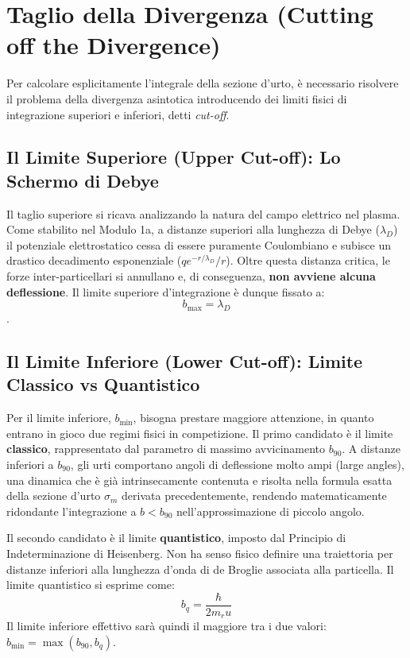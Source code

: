 \section{Taglio della Divergenza (Cutting off the Divergence)}

Per calcolare esplicitamente l'integrale della sezione d'urto, è necessario risolvere il problema della divergenza asintotica introducendo dei limiti fisici di integrazione superiori e inferiori, detti \textit{cut-off}.

\subsection{Il Limite Superiore (Upper Cut-off): Lo Schermo di Debye}
Il taglio superiore si ricava analizzando la natura del campo elettrico nel plasma. Come stabilito nel Modulo 1a, a distanze superiori alla lunghezza di Debye ($\lambda_D$) il potenziale elettrostatico cessa di essere puramente Coulombiano e subisce un drastico decadimento esponenziale ($q e^{-r/\lambda_D}/r$). Oltre questa distanza critica, le forze inter-particellari si annullano e, di conseguenza, \textbf{non avviene alcuna deflessione}. Il limite superiore d'integrazione è dunque fissato a:
\begin{equation}
b_{\text{max}} = \lambda_D
\end{equation}
.

\subsection{Il Limite Inferiore (Lower Cut-off): Limite Classico vs Quantistico}
Per il limite inferiore, $b_{\text{min}}$, bisogna prestare maggiore attenzione, in quanto entrano in gioco due regimi fisici in competizione.
Il primo candidato è il limite \textbf{classico}, rappresentato dal parametro di massimo avvicinamento $b_{90}$. A distanze inferiori a $b_{90}$, gli urti comportano angoli di deflessione molto ampi (large angles), una dinamica che è già intrinsecamente contenuta e risolta nella formula esatta della sezione d'urto $\sigma_m$ derivata precedentemente, rendendo matematicamente ridondante l'integrazione a $b < b_{90}$ nell'approssimazione di piccolo angolo.

Il secondo candidato è il limite \textbf{quantistico}, imposto dal Principio di Indeterminazione di Heisenberg. Non ha senso fisico definire una traiettoria per distanze inferiori alla lunghezza d'onda di de Broglie associata alla particella. Il limite quantistico si esprime come:
\begin{equation}
b_q = \frac{\hbar}{2 m_r u}
\end{equation}
Il limite inferiore effettivo sarà quindi il maggiore tra i due valori: $b_{\text{min}} = \max(b_{90}, b_q)$.

